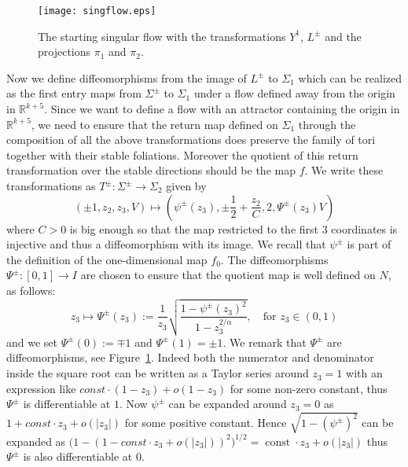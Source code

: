 \documentclass[reqno,12pt,a4paper]{amsart}
\theoremstyle{plain}
\theoremstyle{definition}
\begin{document}
\begin{figure}[htbp]
\begin{center}
 
  \texttt{[image: singflow.eps]}
\end{center}
\caption{The starting singular flow with the transformations
  $Y^1$, $L^\pm$ and the projections $\pi_1$ and $\pi_2$.}
  \label{fig:startflow}
\end{figure}

Now we define diffeomorphisms from the image of $L^\pm$ to
$\Sigma_1$ which can be realized as the first entry maps
from $\Sigma^\pm$ to $\Sigma_1$ under a flow defined away
from the origin in ${{\mathbb R}}^{k+5}$. Since we want to define a
flow with an attractor containing the origin in ${{\mathbb R}}^{k+5}$, we
need to ensure that the return map defined on $\Sigma_1$
through the composition of all the above transformations
does preserve the family of tori together with their stable
foliations. Moreover the quotient of this return
transformation over the stable directions should be the map
$f$.  We write these transformations as
$T^\pm:\Sigma^\pm\to\Sigma_2$ given by
$$
(\pm1,z_2,z_3,V)
\mapsto\left(\psi^\pm(z_3),
 \pm\frac12+\frac{z_2}C,
2,
\Psi^\pm(z_3)V\right)
$$
where $C>0$ is big enough so that the map restricted to the
first $3$ coordinates is injective and thus a diffeomorphism
with its image. We recall that $\psi^\pm$ is part of the
definition of the one-dimensional map $f_0$.  The
diffeomorphisms $\Psi^\pm:[0,1]\to I$ are chosen to ensure
that the quotient map is well defined on $N$, as follows:
$$
z_3\mapsto
\Psi^\pm(z_3):=
\frac1{z_3}\sqrt{\frac{1-\psi^\pm(z_3)^2}{1-z_3^{2/\alpha}}},
\quad\text{for } z_3\in(0,1)
$$
and we set $\Psi^\pm(0):=\mp1$ and $\Psi^\pm(1)=\pm1$. We
remark that $\Psi^\pm$ are diffeomorphisms, see
Figure~\ref{fig:startflow}.  Indeed both the numerator and
denominator inside the square root can be written as a
Taylor series around $z_3=1$ with an expression like
$
const\cdot(1-z_3) + o(1-z_3)
$
for some non-zero constant, thus $\Psi^\pm$ is
differentiable at $1$.  Now $\psi^\pm$ can be expanded
around $z_3=0$ as
$
1+const\cdot z_3 + o(|z_3|)
$
for some positive constant. Hence $\sqrt{1-(\psi^\pm)^2}$
can be expanded as
$
\big(1-(1-const\cdot z_3 + o(|z_3|))^2\big)^{1/2}=
{\operatorname{const}}\cdot z_3 + o(|z_3|)
$
thus $\Psi^\pm$ is also differentiable at $0$.
\end{document}

